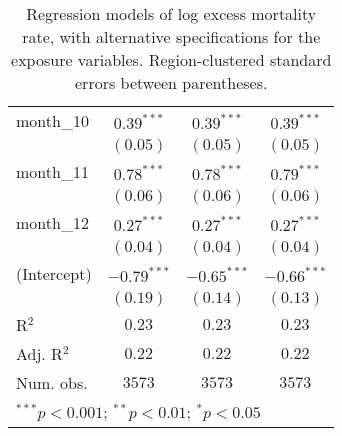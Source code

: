 \begin{table}
\begin{center}
\begin{tabular}{l c c c}
month\_10      & $0.39^{***}$  & $0.39^{***}$  & $0.39^{***}$  \\
               & $(0.05)$      & $(0.05)$      & $(0.05)$      \\
month\_11      & $0.78^{***}$  & $0.78^{***}$  & $0.79^{***}$  \\
               & $(0.06)$      & $(0.06)$      & $(0.06)$      \\
month\_12      & $0.27^{***}$  & $0.27^{***}$  & $0.27^{***}$  \\
               & $(0.04)$      & $(0.04)$      & $(0.04)$      \\
(Intercept)    & $-0.79^{***}$ & $-0.65^{***}$ & $-0.66^{***}$ \\
               & $(0.19)$      & $(0.14)$      & $(0.13)$      \\
\hline
R$^2$          & $0.23$        & $0.23$        & $0.23$        \\
Adj. R$^2$     & $0.22$        & $0.22$        & $0.22$        \\
Num. obs.      & $3573$        & $3573$        & $3573$        \\
\hline
\multicolumn{4}{l}{\scriptsize{$^{***}p<0.001$; $^{**}p<0.01$; $^{*}p<0.05$}}
\end{tabular}
\caption{Regression models of log excess mortality rate, with alternative specifications for the exposure variables. Region-clustered standard errors between parentheses.}
\label{tab:altspecmodels}
\end{center}
\end{table}
